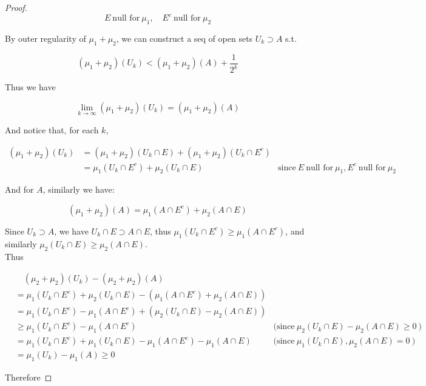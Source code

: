 \documentclass{qlnotes-export}
\begin{document}
\begin{proof}
\[E\ \text{null for}\ \mu_{1},\quad E^{c}\ \text{null for}\ \mu_{2}\]

By outer regularity of \(\mu_{1} + \mu_{2}\), we can construct a seq of open sets \(U_{k} \supset A\) s.t.

\[(\mu_{1} + \mu_{2})(U_{k}) < (\mu_{1} + \mu_{2})(A) + \frac{1}{2^{k}}\]

Thus we have

\[\lim\limits_{k\rightarrow\infty}(\mu_{1} + \mu_{2})(U_{k}) = (\mu_{1} + \mu_{2})(A)\]

And notice that, for each \(k\),

\[\begin{matrix}
{(\mu_{1} + \mu_{2})(U_{k})} & {= (\mu_{1} + \mu_{2})(U_{k} \cap E) + (\mu_{1} + \mu_{2})(U_{k} \cap E^{c})} & \\
 & {= \mu_{1}(U_{k} \cap E^{c}) + \mu_{2}(U_{k} \cap E)\ } & {\text{since}\ E\ \text{null for}\ \mu_{1}, E^{c}\ \text{null for}\ \mu_{2}}
\end{matrix}\]

And for \(A\), similarly we have:

\[(\mu_{1} + \mu_{2})(A) = \mu_{1}(A \cap E^{c}) + \mu_{2}(A \cap E)\]

Since \(U_{k} \supset A\), we have \(U_{k} \cap E \supset A \cap E\), thus \(\mu_{1}(U_{k} \cap E^{c}) \geq \mu_{1}(A \cap E^{c})\), and similarly \(\mu_{2}(U_{k} \cap E) \geq \mu_{2}(A \cap E)\).\\
Thus

\[\begin{matrix}
 & {\quad(\mu_{2} + \mu_{2})(U_{k}) - (\mu_{2} + \mu_{2})(A)} & \\
 & {= \mu_{1}(U_{k} \cap E^{c}) + \mu_{2}(U_{k} \cap E) - (\mu_{1}(A \cap E^{c}) + \mu_{2}(A \cap E))} & \\
 & {= \mu_{1}(U_{k} \cap E^{c}) - \mu_{1}(A \cap E^{c}) + (\mu_{2}(U_{k} \cap E) - \mu_{2}(A \cap E))} & \\
 & {\geq \mu_{1}(U_{k} \cap E^{c}) - \mu_{1}(A \cap E^{c})\ } & {\text{(since}\ \mu_{2}(U_{k} \cap E) - \mu_{2}(A \cap E) \geq 0\ \text{)}} \\
 & {= \mu_{1}(U_{k} \cap E^{c}) + \mu_{1}(U_{k} \cap E) - \mu_{1}(A \cap E^{c}) - \mu_{1}(A \cap E)\ } & {\text{(since}\ \mu_{1}(U_{k} \cap E),\mu_{2}(A \cap E) = 0\ \text{)}} \\
 & {= \mu_{1}(U_{k}) - \mu_{1}(A) \geq 0} &
\end{matrix}\]

Therefore


\end{proof}
\end{document}
